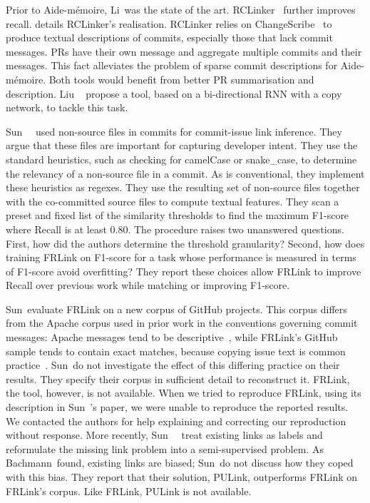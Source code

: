 Prior to Aide-mémoire, Li~\etal was the state of the art.
RCLinker~\cite{RCLinker} further improves recall. 
details RCLinker's realisation. RCLinker relies on
ChangeScribe~\cite{ChangeScribe} to produce textual descriptions of commits,
especially those that lack commit messages. PRs have their own message and
aggregate multiple commits and their messages.  
This fact alleviates the problem of sparse commit descriptions for Aide-mémoire.
Both tools would benefit from better PR summarisation and description. Liu
\etal~\cite{liu2019automatic} propose a tool, based on a bi-directional RNN with
a copy network, to tackle this task. 

Sun~\etal~\cite{FRLink} used non-source files in commits for commit-issue link
inference. They argue that these files are important for capturing developer
intent. They use the standard heuristics, such as checking for camelCase or
snake\_case, to determine the relevancy of a non-source file in a commit. As is
conventional, they implement these heuristics as regexes. They use the resulting
set of non-source files together with the co-committed source files to compute
textual features. They scan a preset and fixed list of the similarity thresholds
to find the maximum F1-score where Recall is at least 0.80. The procedure raises
two unanswered questions. First, how did the authors determine the threshold
granularity? Second, how does training FRLink on F1-score for a task whose
performance is measured in terms of F1-score avoid overfitting? They report
these choices allow FRLink to improve Recall over previous work while matching
or improving F1-score. 

Sun~\etal evaluate FRLink on a new corpus of GitHub projects. This corpus
differs from the Apache corpus used in prior work in the conventions governing
commit messages:  Apache messages tend to be descriptive~\cite{ApachePractice},
while FRLink's GitHub sample tends to contain exact matches, because copying
issue text is common practice~\cite{ruan2019deeplink}. Sun~\etal do not
investigate the effect of this differing practice on their results. They specify
their corpus in sufficient detail to reconstruct it. FRLink, the tool, however,
is not available. When we tried to reproduce FRLink, using its description in
Sun~\etal's paper, we were unable to reproduce the reported results.   
We contacted the authors for help explaining and correcting our reproduction
without response. More recently, Sun~\etal~\cite{PULink} treat existing links as
labels and reformulate the missing link problem into a semi-supervised problem.
As Bachmann~\etal found, existing links are biased; Sun~\etal do not discuss how
they coped with this bias. They report that their solution, PULink, outperforms
FRLink on FRLink's corpus. Like FRLink, PULink is not available.

